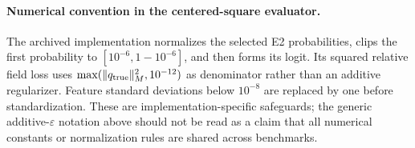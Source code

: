 \paragraph{Numerical convention in the centered-square evaluator.}
The archived implementation normalizes the selected E2 probabilities, clips the first probability to $[10^{-6},1-10^{-6}]$, and then forms its logit. Its squared relative field loss uses $\max(\|q_{\rm true}\|_M^2,10^{-12})$ as denominator rather than an additive regularizer. Feature standard deviations below $10^{-8}$ are replaced by one before standardization. These are implementation-specific safeguards; the generic additive-$\varepsilon$ notation above should not be read as a claim that all numerical constants or normalization rules are shared across benchmarks.
